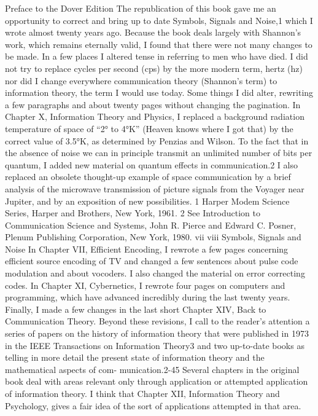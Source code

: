 Preface to the Dover Edition
The republication of this book gave me an opportunity to
correct and bring up to date Symbols, Signals and Noise,1 which I
wrote almost twenty years ago. Because the book deals largely
with Shannon’s work, which remains eternally valid, I found that
there were not many changes to be made. In a few places I altered
tense in referring to men who have died. I did not try to replace
cycles per second (cps) by the more modern term, hertz (hz) nor
did I change everywhere communication theory (Shannon’s term)
to information theory, the term I would use today.
Some things I did alter, rewriting a few paragraphs and about
twenty pages without changing the pagination.
In Chapter X, Information Theory and Physics, I replaced a
background radiation temperature of space of “2° to 4°K” (Heaven
knows where I got that) by the correct value of 3.5°K, as determined
by Penzias and Wilson. To the fact that in the absence of
noise we can in principle transmit an unlimited number of bits per
quantum, I added new material on quantum effects in communication.2
I also replaced an obsolete thought-up example of space
communication by a brief analysis of the microwave transmission
of picture signals from the Voyager near Jupiter, and by an exposition
of new possibilities.
1 Harper Modem Science Series, Harper and Brothers, New York, 1961.
2 See Introduction to Communication Science and Systems, John R. Pierce
and Edward C. Posner, Plenum Publishing Corporation, New York, 1980.
vii
viii Symbols, Signals and Noise
In Chapter VII, Efficient Encoding, I rewrote a few pages concerning
efficient source encoding of TV and changed a few sentences
about pulse code modulation and about vocoders. I also
changed the material on error correcting codes.
In Chapter XI, Cybernetics, I rewrote four pages on computers
and programming, which have advanced incredibly during the last
twenty years.
Finally, I made a few changes in the last short Chapter XIV,
Back to Communication Theory.
Beyond these revisions, I call to the reader’s attention a series
of papers on the history of information theory that were published
in 1973 in the IEEE Transactions on Information Theory3 and
two up-to-date books as telling in more detail the present state
of information theory and the mathematical aspects of com-
munication.2-45
Several chapters in the original book deal with areas relevant
only through application or attempted application of information
theory.
I think that Chapter XII, Information Theory and Psychology,
gives a fair idea of the sort of applications attempted in that area.
